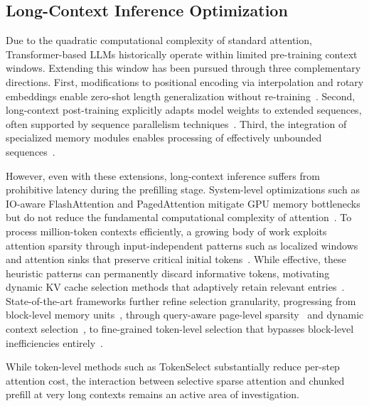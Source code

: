 \documentclass[10pt,conference]{IEEEtran}
\begin{document}
\subsection{Long-Context Inference Optimization}
\label{subsec:long-context}

Due to the quadratic computational complexity of standard attention, 
Transformer-based LLMs historically operate within limited pre-training 
context windows. Extending this window has been pursued through three 
complementary directions. First, modifications to positional encoding 
via interpolation and rotary embeddings enable zero-shot length 
generalization without re-training~\cite{chen2023extending, su2024roformer, 
ntk2023web, peng2024yarn, giraffe2023}. Second, long-context post-training 
explicitly adapts model weights to extended sequences, often supported 
by sequence parallelism techniques~\cite{gemini152024, sparseattention2024, 
du2024chatglm, shoeybi2020megatron}. Third, the integration of specialized 
memory modules enables processing of effectively unbounded 
sequences~\cite{dai2019transformerxl, rae2020compressive, bulatov2022recurrent, 
munkhdalai2024leave}.

However, even with these extensions, long-context inference suffers 
from prohibitive latency during the prefilling stage. System-level 
optimizations such as IO-aware FlashAttention and PagedAttention 
mitigate GPU memory bottlenecks but do not reduce the fundamental 
computational complexity of attention~\cite{dao2022flashattention, 
kwon2023efficient}. To process million-token contexts efficiently, 
a growing body of work exploits attention sparsity through 
input-independent patterns such as localized windows~\cite{wang2019multipassage, 
untieknots2025} and attention sinks that preserve critical initial 
tokens~\cite{han2024lminfinite, xiao2024efficient}. While effective, 
these heuristic patterns can permanently discard informative tokens, 
motivating dynamic KV cache selection methods that adaptively retain 
relevant entries~\cite{zhang2024h2o, li2024snapkv}. State-of-the-art 
frameworks further refine selection granularity, progressing from 
block-level memory units~\cite{xiao2024infllm}, through query-aware 
page-level sparsity~\cite{tang2024quest} and dynamic context 
selection~\cite{omnikv2025, jiang2024minference}, to fine-grained 
token-level selection that bypasses block-level inefficiencies 
entirely~\cite{tokenselect2025}.

While token-level methods such as TokenSelect substantially reduce 
per-step attention cost, the interaction between selective sparse 
attention and chunked prefill at very long contexts remains an active 
area of investigation.
\end{document}
